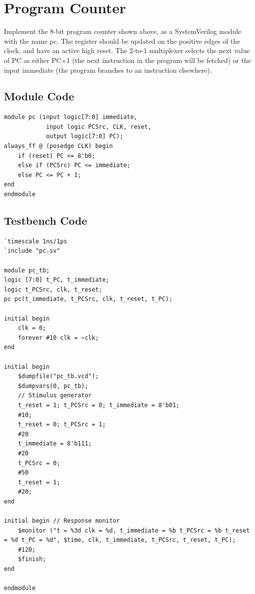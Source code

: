 \documentclass{article}
\begin{document}
\newpage
\section{Program Counter}
Implement the 8-bit program counter shown above, as a SystemVerilog module with the name pc. The register should be updated on the positive edges of the clock, and have an active high reset. The 2-to-1 multiplexer selects the next value of PC as either PC+1 (the next instruction in the program will be fetched) or the input immediate (the program branches to an instruction elsewhere).

\subsection{Module Code}
\begin{lstlisting}
module pc (input logic[7:0] immediate, 
            input logic PCSrc, CLK, reset,
            output logic[7:0] PC);
always_ff @ (posedge CLK) begin
    if (reset) PC <= 8'b0; 
    else if (PCSrc) PC <= immediate;
    else PC <= PC + 1; 
end
endmodule
\end{lstlisting}

\subsection{Testbench Code}
\begin{lstlisting}
`timescale 1ns/1ps
`include "pc.sv"

module pc_tb;
logic [7:0] t_PC, t_immediate;
logic t_PCSrc, clk, t_reset;
pc pc(t_immediate, t_PCSrc, clk, t_reset, t_PC);

initial begin
    clk = 0;
    forever #10 clk = ~clk;
end

initial begin
    $dumpfile("pc_tb.vcd"); 
    $dumpvars(0, pc_tb);
    // Stimulus generator
    t_reset = 1; t_PCSrc = 0; t_immediate = 8'b01;
    #10;
    t_reset = 0; t_PCSrc = 1;
    #20
    t_immediate = 8'b111;
    #20
    t_PCSrc = 0;
    #50
    t_reset = 1;
    #20;
end

initial begin // Response monitor
    $monitor ("t = %3d clk = %d, t_immediate = %b t_PCSrc = %b t_reset = %d t_PC = %d", $time, clk, t_immediate, t_PCSrc, t_reset, t_PC);
    #120;
    $finish; 
end

endmodule
\end{lstlisting}
\end{document}
